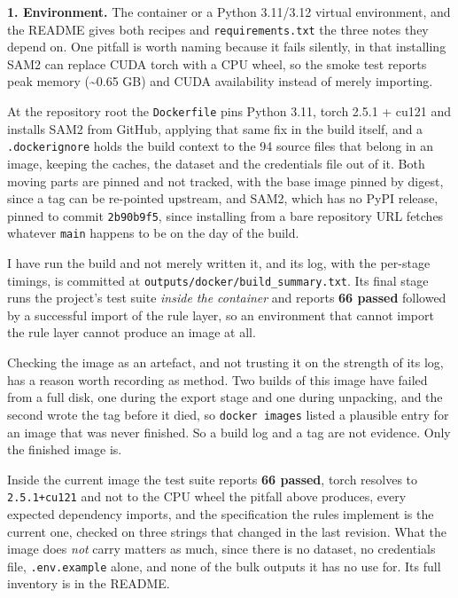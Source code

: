 \textbf{1. Environment.} The container or a Python 3.11/3.12 virtual environment, and the README gives both recipes and \texttt{requirements.txt} the three notes they depend on. One pitfall is worth naming because it fails silently, in that installing SAM2 can replace CUDA torch with a CPU wheel, so the smoke test reports peak memory (\textasciitilde{}0.65 GB) and CUDA availability instead of merely importing.

At the repository root the \texttt{Dockerfile} pins Python 3.11, torch 2.5.1 + cu121 and installs SAM2 from GitHub, applying that same fix in the build itself, and a \texttt{.dockerignore} holds the build context to the 94 source files that belong in an image, keeping the caches, the dataset and the credentials file out of it. Both moving parts are pinned and not tracked, with the base image pinned by digest, since a tag can be re-pointed upstream, and SAM2, which has no PyPI release, pinned to commit \texttt{2b90b9f5}, since installing from a bare repository URL fetches whatever \texttt{main} happens to be on the day of the build.

I have run the build and not merely written it, and its log, with the per-stage timings, is committed at \texttt{outputs/docker/build\_\allowbreak{}summary.txt}. Its final stage runs the project's test suite \textit{inside the container} and reports \textbf{66 passed} followed by a successful import of the rule layer, so an environment that cannot import the rule layer cannot produce an image at all.

Checking the image as an artefact, and not trusting it on the strength of its log, has a reason worth recording as method. Two builds of this image have failed from a full disk, one during the export stage and one during unpacking, and the second wrote the tag before it died, so \texttt{docker images} listed a plausible entry for an image that was never finished. So a build log and a tag are not evidence. Only the finished image is.

Inside the current image the test suite reports \textbf{66 passed}, torch resolves to \texttt{2.5.1+cu121} and not to the CPU wheel the pitfall above produces, every expected dependency imports, and the specification the rules implement is the current one, checked on three strings that changed in the last revision. What the image does \textit{not} carry matters as much, since there is no dataset, no credentials file, \texttt{.env.example} alone, and none of the bulk outputs it has no use for. Its full inventory is in the README.

